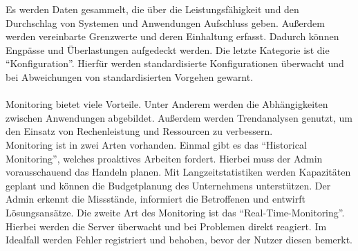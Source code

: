 Es werden Daten gesammelt, die über die Leistungsfähigkeit und den Durchschlag von Systemen und Anwendungen Aufschluss geben.
Außerdem werden vereinbarte Grenzwerte und deren Einhaltung erfasst.
Dadurch können Engpässe und Überlastungen aufgedeckt werden.
Die letzte Kategorie ist die \enquote{Konfiguration}.
Hierfür werden standardisierte Konfigurationen überwacht und bei Abweichungen von standardisierten Vorgehen gewarnt.
\\
\\
Monitoring bietet viele Vorteile.
Unter Anderem werden die Abhängigkeiten zwischen Anwendungen abgebildet.
Außerdem werden Trendanalysen genutzt, um den Einsatz von Rechenleistung und Ressourcen zu verbessern.
\\
Monitoring ist in zwei Arten vorhanden.
Einmal gibt es das \enquote{Historical Monitoring}, welches proaktives Arbeiten fordert.
Hierbei muss der Admin vorausschauend das Handeln planen.
Mit Langzeitstatistiken werden Kapazitäten geplant und können die Budgetplanung des Unternehmens unterstützen.
Der Admin erkennt die Missstände, informiert die Betroffenen und entwirft Lösungsansätze.
Die zweite Art des Monitoring ist das \enquote{Real-Time-Monitoring}.
Hierbei werden die Server überwacht und bei Problemen direkt reagiert.
Im Idealfall werden Fehler registriert und behoben, bevor der Nutzer diesen bemerkt.\autocite{cloudradar, wbs, crossmedia}

